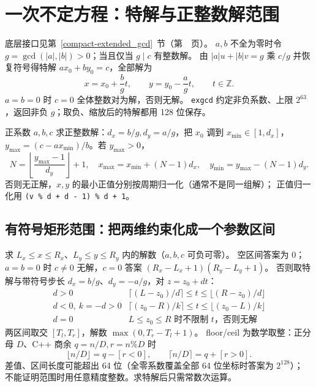 \section{一次不定方程：特解与正整数解范围}\label{knowledge-diophantine-bounds}
底层接口见第~\ref{compact-extended_gcd}~节（第~\pageref{compact-extended_gcd}~页）。
$a,b$ 不全为零时令 $g=\gcd(|a|,|b|)>0$；当且仅当 $g\mid c$ 有整数解。
由 $|a|u+|b|v=g$ 乘 $c/g$ 并恢复符号得特解 $ax_0+by_0=c$，全部解为
\[
x=x_0+\frac bg t,\qquad y=y_0-\frac ag t,\qquad t\in\mathbb Z.
\]
$a=b=0$ 时 $c=0$ 全体整数对为解，否则无解。
\texttt{exgcd} 约定非负系数、上限 $2^{63}$，返回非负 $g$；取负、缩放后的特解都用 128 位保存。

正系数 $a,b,c$ 求正整数解：$d_x=b/g,d_y=a/g$，把 $x_0$ 调到 $x_{\min}\in[1,d_x]$，
$y_{\max}=(c-ax_{\min})/b$。若 $y_{\max}>0$，
\[
N=\left\lfloor\frac{y_{\max}-1}{d_y}\right\rfloor+1,
\quad x_{\max}=x_{\min}+(N-1)d_x,
\quad y_{\min}=y_{\max}-(N-1)d_y.
\]
否则无正解，$x,y$ 的最小正值分别按周期归一化（通常不是同一组解）；
正值归一化用 \texttt{(v \% d + d - 1) \% d + 1}。

\subsection{有符号矩形范围：把两维约束化成一个参数区间}
求 $L_x\le x\le R_x$、$L_y\le y\le R_y$ 内的解数（$a,b,c$ 可负可零）。
空区间答案为 0；$a=b=0$ 时 $c\ne0$ 无解，$c=0$ 答案 $(R_x-L_x+1)(R_y-L_y+1)$。
否则取特解与带符号步长 $d_x=b/g$、$d_y=-a/g$，对 $z=z_0+dt$：
\[
\begin{array}{c|c}
 d>0 & \lceil(L-z_0)/d\rceil\le t\le\lfloor(R-z_0)/d\rfloor\\[2pt]
 d<0,\ k=-d>0 & \lceil(z_0-R)/k\rceil\le t\le\lfloor(z_0-L)/k\rfloor\\[2pt]
 d=0 & L\le z_0\le R\text{ 时不限制 }t\text{，否则无解}
\end{array}
\]
两区间取交 $[T_l,T_r]$，解数 $\max(0,T_r-T_l+1)$。
floor/ceil 为数学取整：正分母 $D$、C++ 商余 $q=n/D,r=n\%D$ 时
\[
\lfloor n/D\rfloor=q-[r<0],\qquad
\lceil n/D\rceil=q+[r>0].
\]
差值、区间长度可能超出 64 位（全零系数覆盖全部 64 位坐标时答案为 $2^{128}$）；
不能证明范围时用任意精度整数。求特解后只需常数次运算。
